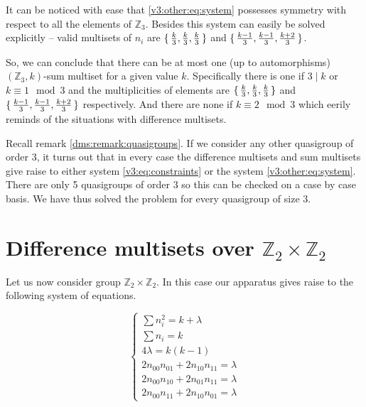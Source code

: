 \documentclass{article}
\theoremstyle{plain}
\theoremstyle{definition}
\theoremstyle{remark}
\begin{document}
			It can be noticed with ease that \eqref{v3:other:eq:system} possesses symmetry with respect to all the elements of $\mathbb Z_3$. Besides this system can easily be solved explicitly -- valid multisets of $n_i$ are $\set{\frac k 3, \frac k 3, \frac k 3}$ and $\set{\frac{k-1}{3}, \frac{k-1}{3}, \frac{k+2}{3}}$.
			
			So, we can conclude that there can be at most one (up to automorphisms) $(\mathbb Z_3, k)$-sum multiset for a given value $k$. Specifically there is one if $3 \mid k$ or $k \equiv 1 \mod 3$ and the multiplicities of elements are $\set{\frac k 3, \frac k 3, \frac k 3}$ and $\set{\frac{k-1}{3}, \frac{k-1}{3}, \frac{k+2}{3}}$ respectively. And there are none if $k \equiv 2 \mod 3$ which eerily reminds of the situations with difference multisets.
			
			Recall remark \ref{dms:remark:quasigroups}. If we consider any other quasigroup of order 3, it turns out that in every case the difference multisets and sum multisets give raise to either system \eqref{v3:eq:constraints} or the system \eqref{v3:other:eq:system}. There are only 5 quasigroups of order 3 so this can be checked on a case by case basis. We have thus solved the problem for every quasigroup of size 3.
	
	\section{Difference multisets over $\mathbb Z_2 \times \mathbb Z_2$}
		Let us now consider group $\mathbb Z_2 \times \mathbb Z_2$. In this case our apparatus gives raise to the following system of equations.
		
		\begin{equation}
			\label{v4:eq:constraints}
			\begin{cases}
				\sum n_i^2 = k + \lambda \\
				\sum n_i = k \\
				4 \lambda = k(k-1) \\
				2 n_{00} n_{01} + 2 n_{10} n_{11} = \lambda \\
				2 n_{00} n_{10} + 2 n_{01} n_{11} = \lambda \\
				2 n_{00} n_{11} + 2 n_{10} n_{01} = \lambda
			\end{cases}
		\end{equation}
		
\end{document}
